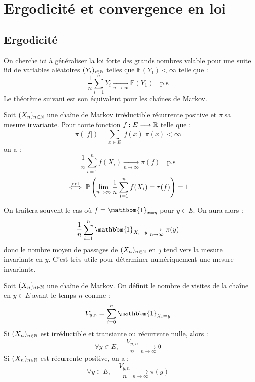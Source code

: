 
\section{Ergodicité et convergence en loi}

\subsection{Ergodicité}

On cherche ici à généraliser la loi forte des grands nombres valable pour une suite iid de 
variables aléatoires $(Y_i)_{i \in \mathbb{N}}$ telles que $ \mathbb{E}(Y_1) < \infty$ telle que : 
    \[ \frac{1}{n} \sum_{i=1}^{n} Y_i \underset{n \to \infty}{\longrightarrow} \mathbb{E}(Y_1) \quad \text{p.s}   \] 
Le théorème suivant est son équivalent pour les chaînes de Markov. 

\begin{theorem}
    Soit $(X_n)_{n \in \mathbb{N}}$ une chaîne de Markov irréductible récurrente positive et $ \pi$ sa mesure invariante. 
    Pour toute fonction $f : E \longrightarrow \mathbb{R}$ telle que :
        \[ \pi (|f|) = \sum_{x \in E} |f(x)| \pi(x) < \infty \] 
    on a : 
        \[ \boxed{ \frac{1}{n} \sum_{i=1}^{n} f(X_i) \underset{n \to \infty}{\longrightarrow} \pi(f)} \quad \text{p.s}  \] 
        \[ \overset{\text{def}}{\iff} \mathbb{P} \left( \lim_{n \to \infty} \frac{1}{n} \sum_{i = 1}^{n} f(X_i) = \pi(f) \right) = 1  \] 
\end{theorem}

\begin{remark}
    On traitera souvent le cas où $f = \mathbbm{1}_{x = y} $ pour $ y \in E$. On aura alors : 
        \[ \frac{1}{n} \sum_{i=1}^{n} \mathbbm{1}_{X_i = y} \underset{n \to \infty}{\longrightarrow} \pi(y) \]
    donc le nombre moyen de passages de $(X_n)_{n \in \mathbb{N}}$ en $y$ tend vers la mesure invariante en $y$. 
    C'est très utile pour déterminer numériquement une mesure invariante. 
\end{remark}

\begin{proposition}
    Soit $(X_n)_{n \in \mathbb{N}}$ une chaîne de Markov. On définit le nombre de visites de la chaîne en $y \in E$ 
    avant le temps $n$ comme : 
        \[ V_{y,n} = \sum_{i=0}^{n} \mathbbm{1}_{X_i = y}  \] 
    Si $(X_n)_{n \in \mathbb{N}}$ est irréductible et transiante ou récurrente nulle, alors : 
        \[ \forall y \in E, \quad  \frac{V_{y,n}}{n} \underset{n \to \infty}{\longrightarrow} 0 \]
    Si $(X_n)_{n \in \mathbb{N}}$ est récurrente positive, on a : 
        \[ \forall y \in E, \quad  \frac{V_{y,n}}{n} \underset{n \to \infty}{\longrightarrow} \pi(y) \]  
\end{proposition}

